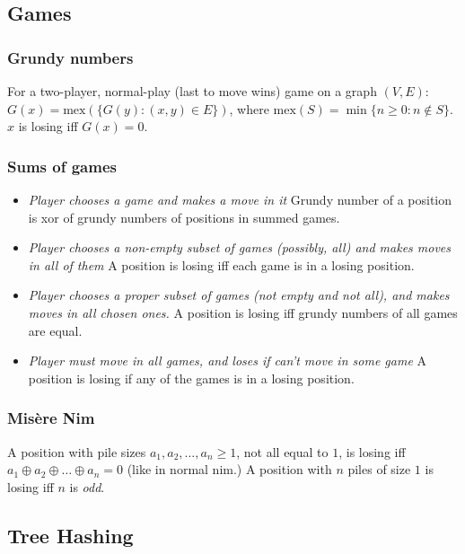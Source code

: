 \subsection{Games}

\subsubsection{Grundy numbers}
For a two-player, normal-play (last to move wins) game on a graph $(V,E)$:
$G(x) = \mbox{mex}(\{ G(y) : (x, y) \in E \})$,
where $\mbox{mex}(S) = \min \{ n \ge 0: n \not\in S \}$.
$x$ is losing iff $G(x) = 0$.

\subsubsection{Sums of games}

\vspace{-1mm}
\begin{itemize}
  \item
    \emph{Player chooses a game and makes a move in it}
    Grundy number of a position is xor of grundy numbers of positions in summed games.
    \vspace{-1mm}
  \item
    \emph{Player chooses a non-empty subset of games (possibly, all) and makes moves in all of them}
    A position is losing iff each game is in a losing position.
  \vspace{-1mm}
  \item
    \emph{Player chooses a proper subset of games (not empty and not all),
        and makes moves in all chosen ones.}
    A position is losing iff grundy numbers of all games are equal.
    \vspace{-1mm}
  \item
    \emph{Player must move in all games, and loses if can't move in some game}
    A position is losing if any of the games is in a losing position.
\end{itemize}

\subsubsection{Mis\`{e}re Nim}
A position with pile sizes $a_1, a_2, \dots, a_n \ge 1$,
not all equal to $1$, is losing iff $a_1 \oplus a_2 \oplus \dots \oplus a_n = 0$
(like in normal nim.)
A position with $n$ piles of size $1$ is losing iff $n$ is \emph{odd}.

\subsection{Tree Hashing}


